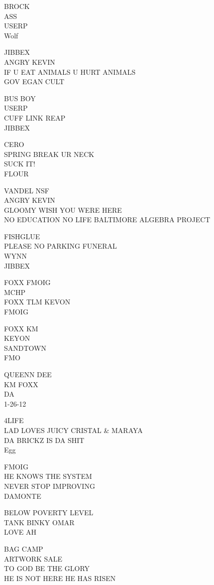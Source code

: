 \documentclass[10pt,letterpaper]{article}
\begin{document}
BROCK\\
ASS\\
USERP\\
Wolf

JIBBEX\\
ANGRY KEVIN\\
IF U EAT ANIMALS U HURT ANIMALS\\
GOV EGAN CULT

BUS BOY\\
USERP\\
CUFF LINK REAP\\
JIBBEX

CERO\\
SPRING BREAK UR NECK\\
SUCK IT!\\
FLOUR

VANDEL NSF\\
ANGRY KEVIN\\
GLOOMY WISH YOU WERE HERE\\
NO EDUCATION NO LIFE BALTIMORE ALGEBRA PROJECT

FISHGLUE\\
PLEASE NO PARKING FUNERAL\\
WYNN\\
JIBBEX

FOXX FMOIG\\
MCHP\\
FOXX TLM KEVON\\
FMOIG

FOXX KM\\
KEYON\\
SANDTOWN\\
FMO

QUEENN DEE\\
KM FOXX\\
DA\\
1{-}26{-}12

4LIFE\\
LAD LOVES JUICY CRISTAL \& MARAYA\\
DA BRICKZ IS DA SHIT\\
Egg

FMOIG\\
HE KNOWS THE SYSTEM\\
NEVER STOP IMPROVING\\
DAMONTE

BELOW POVERTY LEVEL\\
TANK BINKY OMAR\\
LOVE AH

BAG CAMP\\
ARTWORK SALE\\
TO GOD BE THE GLORY\\
HE IS NOT HERE HE HAS RISEN
\end{document}
